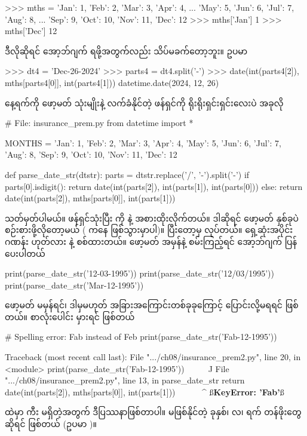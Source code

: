\begin{codetxt}
>>> mths = {'Jan': 1, 'Feb': 2, 'Mar': 3, 'Apr': 4, 
...         'May': 5, 'Jun': 6, 'Jul': 7, 'Aug': 8, 
...         'Sep': 9, 'Oct': 10, 'Nov': 11, 'Dec': 12}
>>> mths['Jan']
1
>>> mths['Dec']
12
\end{codetxt}
ဒီလိုဆိုရင်  အော့ဘ်ဂျက် ရဖို့အတွက်လည်း သိပ်မခက်တော့ဘူး။ ဥပမာ
\begin{codetxt}
>>> dt4 = 'Dec-26-2024'
>>> parts4 = dt4.split('-')
>>> date(int(parts4[2]), mths[parts4[0]], int(parts4[1]))
datetime.date(2024, 12, 26)
\end{codetxt}

နေ့ရက်ကို ဖော့မတ် သုံးမျိုးနဲ့ လက်ခံနိုင်တဲ့ ဖန်ရှင်ကို ရိုးရိုးရှင်းရှင်းလေးပဲ အခုလို
%
\begin{py}
# File: insurance_prem.py
from datetime import *

MONTHS = {'Jan': 1, 'Feb': 2, 'Mar': 3, 'Apr': 4,
          'May': 5, 'Jun': 6, 'Jul': 7, 'Aug': 8,
          'Sep': 9, 'Oct': 10, 'Nov': 11, 'Dec': 12}

def parse_date_str(dtstr):
    parts = dtstr.replace('/', '-').split('-')
    if parts[0].isdigit():
        return date(int(parts[2]), int(parts[1]), int(parts[0]))
    else:
        return date(int(parts[2]), mths[parts[0]], int(parts[1]))
\end{py}
%
သတ်မှတ်ပါမယ်။  ဖန်ရှင်သုံးပြီး \fCode{/} ကို \fCode{-} နဲ့ အစားထိုးလိုက်တယ်။ ဒါဆိုရင် ဖော့မတ် နှစ်ခုပဲ စဉ်းစားဖို့လိုတော့မယ် ( ကနေ  ဖြစ်သွားမှာပါ)။ ပြီးတော့မှ  လုပ်တယ်။ ရှေ့ဆုံးအပိုင်း  ဂဏန်း ဟုတ်လား  နဲ့ စစ်ထားတယ်။ ဖော့မတ် အမှန်နဲ့ စမ်းကြည့်ရင်  အော့ဘ်ဂျက်  ပြန်ပေးပါတယ်
%
\begin{py}
print(parse_date_str('12-03-1995'))
print(parse_date_str('12/03/1995'))
print(parse_date_str('Mar-12-1995'))
\end{py}
%
ဖော့မတ် မမှန်ရင်၊ ဒါမှမဟုတ် အခြားအကြောင်းတစ်ခုခုကြောင့်  ပြောင်းလို့မရရင်  ဖြစ်တယ်။  စာလုံးပေါင်း မှားရင်  ဖြစ်တယ်
%
\begin{py}
# Spelling error: Fab instead of Feb
print(parse_date_str('Fab-12-1995'))
\end{py}
%
\begin{codetxt}
Traceback (most recent call last):
  File ".../ch08/insurance_prem2.py", line 20, in <module>
    print(parse_date_str('Fab-12-1995'))
          ^^^^^^^^^^^^^^^^^^^^^^^^^^^^^
  File ".../ch08/insurance_prem2.py", line 13, in parse_date_str
    return date(int(parts[2]), mths[parts[0]], int(parts[1]))
                               ~~~~^^^^^^^^^^
ß\textbf{KeyError: 'Fab'}ß
\end{codetxt}
 ထဲမှာ  ကီး မရှိတဲ့အတွက် ဒီပြဿနာဖြစ်တာပါ။ မဖြစ်နိုင်တဲ့ ခုနှစ်၊ လ၊ ရက် တန်ဖိုးတွေဆိုရင်  ဖြစ်တယ် (ဥပမာ )။

